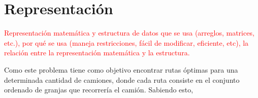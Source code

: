 \section{Representación}

\textcolor{red}{Representación matemática y estructura de datos que se usa (arreglos, matrices, etc.), por qué se usa (maneja restricciones, fácil de modificar, eficiente, etc), la relación entre la representación matemática y la estructura.}

Como este problema tiene como objetivo encontrar rutas óptimas para una determinada cantidad de camiones, donde cada ruta consiste en el conjunto ordenado de granjas que recorrería el camión. Sabiendo esto, 
